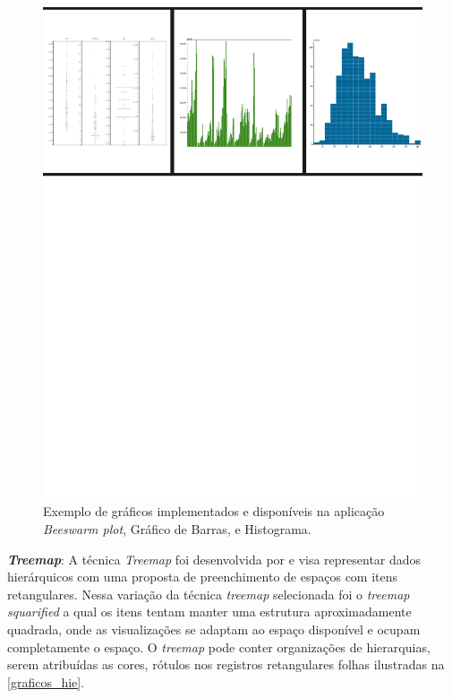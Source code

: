 \documentclass[
	12pt,				%
	openright,			%
	oneside,			%
	a4paper,			%
	english,			%
	brazil				%
	]{abntex2}
\begin{document}
\begin{figure}[h]
	\caption{\label{fig_dash_bars} Exemplo de gráficos implementados e disponíveis na aplicação \textit{Beeswarm plot}, Gráfico de Barras, e Histograma.}
	\begin{center}
	    \includegraphics[width=\textwidth,size=1, trim={0mm 180mm, 0mm 0mm},clip]{figures/garficos_2.pdf}
	\end{center}
\end{figure}

\textbf{\textit{Treemap}}: A técnica  \textit{Treemap} foi desenvolvida por \cite{johnson1999tree} e visa representar dados hierárquicos com uma proposta de preenchimento de espaços com itens retangulares. Nessa variação da técnica \textit{treemap} selecionada foi o \textit{treemap squarified} a qual os itens tentam manter uma estrutura aproximadamente quadrada, onde as visualizações se adaptam ao espaço disponível e ocupam completamente o espaço. O \textit{treemap} pode conter organizações de hierarquias, serem atribuídas as cores, rótulos nos registros retangulares folhas ilustradas na \autoref{graficos_hie}. 
\end{document}
